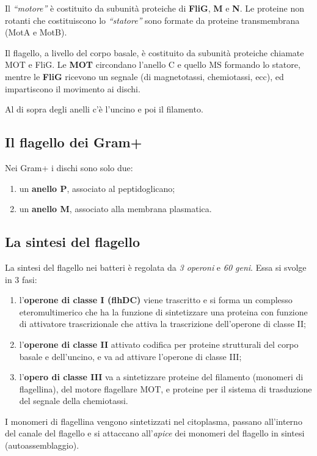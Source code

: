 \documentclass[11pt]{book}
\begin{document}
Il \emph{``motore''} è costituito da subunità proteiche di \textbf{FliG}, \textbf{M }e \textbf{N}. Le proteine non rotanti che costituiscono lo \emph{``statore''} sono formate da proteine transmembrana (MotA e MotB).

Il flagello, a livello del corpo basale, è costituito da subunità proteiche chiamate MOT e FliG.
Le \textbf{MOT} circondano l’anello C e quello MS  formando lo statore, mentre le \textbf{FliG} ricevono un segnale (di magnetotassi, chemiotassi, ecc), ed impartiscono il movimento ai dischi.

Al di sopra degli anelli c’è l’uncino e poi il filamento.


\subsection{Il flagello dei Gram+}

Nei Gram+ i dischi sono solo due:
\begin{enumerate}
\item un \textbf{anello P}, associato al peptidoglicano;
\item un \textbf{anello M}, associato alla membrana plasmatica.
\end{enumerate}

\subsection{La sintesi del flagello}

La sintesi del flagello nei batteri è regolata da \emph{3 operoni} e \emph{60 geni}.
Essa si svolge in 3 fasi:
\begin{enumerate}
\item l’\textbf{operone di classe I (flhDC)} viene trascritto e si forma un complesso eteromultimerico che ha la funzione di sintetizzare una proteina con funzione di attivatore trascrizionale che attiva la trascrizione dell’operone di classe II;
\item l’\textbf{operone di classe II} attivato codifica per proteine strutturali del corpo basale e dell’uncino, e va ad attivare l’operone di classe III;
\item l’\textbf{opero di classe III} va a sintetizzare proteine del filamento (monomeri di flagellina), del motore flagellare MOT, e proteine per il sistema di trasduzione del segnale della chemiotassi.
\end{enumerate}

I monomeri di flagellina vengono sintetizzati nel citoplasma, passano all’interno del canale del flagello e si attaccano all’\emph{apice} dei monomeri del flagello in sintesi (autoassemblaggio).
\end{document}
